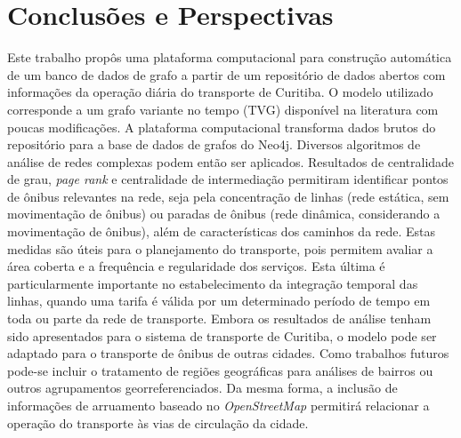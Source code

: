 
\chapter{Conclusões e Perspectivas}\label{cap:conclusoeseperspectivas}


Este trabalho propôs uma plataforma computacional para construção automática de um banco de dados de grafo a partir de um repositório de dados abertos com informações da operação diária do transporte de Curitiba. O modelo utilizado corresponde a um grafo variante no tempo (TVG) disponível na literatura com poucas modificações. A plataforma computacional transforma dados brutos do repositório para a base de dados de grafos do Neo4j. Diversos algoritmos de análise de redes complexas podem então ser aplicados. Resultados de centralidade de grau, \emph{page rank} e centralidade de intermediação permitiram identificar pontos de ônibus relevantes na rede, seja pela concentração de linhas (rede estática, sem movimentação de ônibus) ou paradas de ônibus (rede dinâmica, considerando a movimentação de ônibus), além de características dos caminhos da rede. Estas medidas são úteis para o planejamento do transporte, pois permitem avaliar a área coberta e a frequência e regularidade dos serviços. Esta última é particularmente importante no estabelecimento da integração temporal das linhas, quando uma tarifa é válida por um determinado período de tempo em toda ou parte da rede de transporte. Embora os resultados de análise tenham sido apresentados para o sistema de transporte de Curitiba, o modelo pode ser adaptado para o transporte de ônibus de outras cidades. Como trabalhos futuros pode-se incluir o tratamento de regiões geográficas para análises de bairros ou outros agrupamentos georreferenciados. Da mesma forma, a inclusão de informações de arruamento baseado no \emph{OpenStreetMap} permitirá relacionar a operação do transporte às vias de circulação da cidade.
